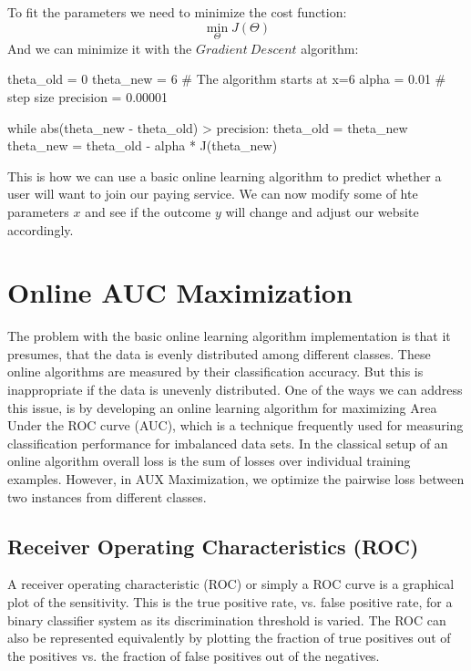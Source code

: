 \documentclass[journal]{IEEEtran/IEEEtran}
\begin{document}
To fit the parameters we need to minimize the cost function:
$$\displaystyle\min_\Theta J(\Theta)$$
And we can minimize it with the $Gradient\ Descent$ algorithm:
\begin{code}
theta_old = 0
theta_new = 6 # The algorithm starts at x=6
alpha = 0.01 # step size
precision = 0.00001

while abs(theta_new - theta_old) > precision:
  theta_old = theta_new
  theta_new = theta_old - alpha * J(theta_new)
\end{code}

This is how we can use a basic online learning algorithm to predict whether a user will want to join our paying service. We can now modify some of hte parameters $x$ and see if the outcome $y$ will change and adjust our website accordingly.
\section{Online AUC Maximization}
The problem with the basic online learning algorithm implementation is that it presumes, that the data is evenly distributed among different classes. These online algorithms are measured by their classification accuracy. But this is inappropriate if the data is unevenly distributed. One of the ways we can address this issue, is by developing an online learning algorithm for maximizing Area Under the ROC curve (AUC), which is a technique frequently used for measuring classification performance for imbalanced data sets. In the classical setup of an online algorithm overall loss is the sum of losses over individual training examples. However, in AUX Maximization, we optimize the pairwise loss between two instances from different classes. 
\subsection{Receiver Operating Characteristics (ROC)}
A receiver operating characteristic (ROC) or simply a ROC curve is a graphical plot of the sensitivity. This is the true positive rate, vs. false positive rate, for a binary classifier system as its discrimination threshold is varied. The ROC can also be represented equivalently by plotting the fraction of true positives out of the positives vs. the fraction of false positives out of the negatives. 
\end{document}

